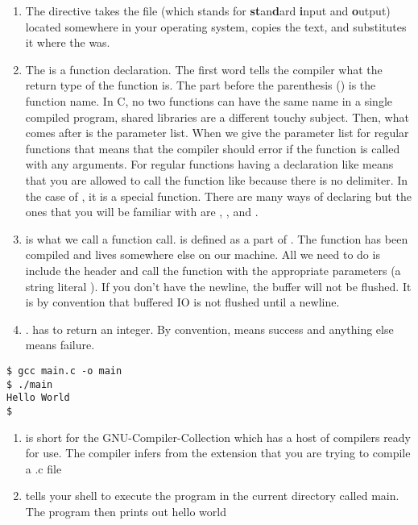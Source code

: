 \begin{enumerate}
	\item The  directive takes the file  (which stands for \textbf{st}an\textbf{d}ard \textbf{i}nput and \textbf{o}utput) located somewhere in your operating system, copies the text, and substitutes it where the  was.
	\item The  is a function declaration. The first word  tells the compiler what the return type of the function is. The part before the parenthesis () is the function name. In C, no two functions can have the same name in a single compiled program, shared libraries are a different touchy subject. Then, what comes after is the parameter list. When we give the parameter list for regular functions  that means that the compiler should error if the function is called with any arguments. For regular functions having a declaration like  means that you are allowed to call the function like  because there is no delimiter. In the case of , it is a special function. There are many ways of declaring  but the ones that you will be familiar with are , , and .
	\item {} is what we call a function call.  is defined as a part of . The function has been compiled and lives somewhere else on our machine. All we need to do is include the header and call the function with the appropriate parameters (a string literal ). If you don't have the newline, the buffer will not be flushed. It is by convention that buffered IO is not flushed until a newline.
	\item {}.  has to return an integer. By convention,  means success and anything else means failure.
\end{enumerate}

\begin{verbatim}
$ gcc main.c -o main
$ ./main
Hello World
$
\end{verbatim}

\begin{enumerate}
	\item {} is short for the GNU-Compiler-Collection which has a host of compilers ready for use. The compiler infers from the extension that you are trying to compile a .c file
	\item {} tells your shell to execute the program in the current directory called main. The program then prints out hello world
\end{enumerate}

